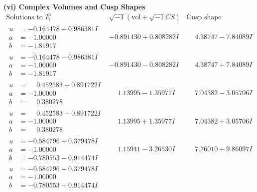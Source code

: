 \documentclass[1p]{elsarticle_modified}
\theoremstyle{definition}
\newcommand{\I}{\sqrt{-1}}
\begin{document}
\newpage\flushleft \textbf{(vi) Complex Volumes and Cusp Shapes}
$$\begin{array}{c|c|c}  
\text{Solutions to }I^u_{7}& \I (\text{vol} + \sqrt{-1}CS) & \text{Cusp shape}\\
 \hline 
\begin{aligned}
u &= -0.164478 + 0.986381 I \\
a &= -1.00000\phantom{ +0.000000I} \\
b &= -1.81917\phantom{ +0.000000I}\end{aligned}
 & -0.891430 + 0.808282 I & \phantom{-}4.38747 - 7.84089 I \\ \hline\begin{aligned}
u &= -0.164478 - 0.986381 I \\
a &= -1.00000\phantom{ +0.000000I} \\
b &= -1.81917\phantom{ +0.000000I}\end{aligned}
 & -0.891430 - 0.808282 I & \phantom{-}4.38747 + 7.84089 I \\ \hline\begin{aligned}
u &= \phantom{-}0.452583 + 0.891722 I \\
a &= -1.00000\phantom{ +0.000000I} \\
b &= \phantom{-}0.380278\phantom{ +0.000000I}\end{aligned}
 & \phantom{-}1.13995 - 1.35977 I & \phantom{-}7.04382 - 3.05706 I \\ \hline\begin{aligned}
u &= \phantom{-}0.452583 - 0.891722 I \\
a &= -1.00000\phantom{ +0.000000I} \\
b &= \phantom{-}0.380278\phantom{ +0.000000I}\end{aligned}
 & \phantom{-}1.13995 + 1.35977 I & \phantom{-}7.04382 + 3.05706 I \\ \hline\begin{aligned}
u &= -0.584796 + 0.379478 I \\
a &= -1.00000\phantom{ +0.000000I} \\
b &= -0.780553 - 0.914474 I\end{aligned}
 & \phantom{-}1.15941 - 3.26530 I & \phantom{-}7.76010 + 9.86097 I \\ \hline\begin{aligned}
u &= -0.584796 - 0.379478 I \\
a &= -1.00000\phantom{ +0.000000I} \\
b &= -0.780553 + 0.914474 I\end{aligned}

\end{array}$$
\end{document}
